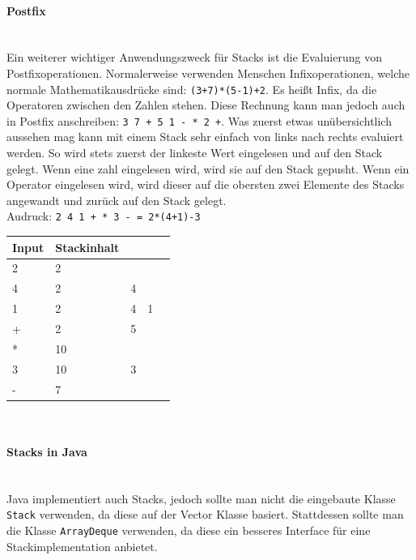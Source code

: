 \documentclass{article}
\newcommand{\paragraphlb}[1]{\paragraph{#1}\mbox{}\\}
\begin{document}
	\paragraphlb{Postfix}
	Ein weiterer wichtiger Anwendungszweck für Stacks ist die Evaluierung von Postfixoperationen. Normalerweise verwenden Menschen Infixoperationen, welche normale Mathematikausdrücke sind: \texttt{(3+7)*(5-1)+2}. Es heißt Infix, da die Operatoren zwischen den Zahlen stehen. Diese Rechnung kann man jedoch auch in Postfix anschreiben: \texttt{3 7 + 5 1 - * 2 +}. Was zuerst etwas unübersichtlich aussehen mag kann mit einem Stack sehr einfach von links nach rechts evaluiert werden. So wird stets zuerst der linkeste Wert eingelesen und auf den Stack gelegt. Wenn eine zahl eingelesen wird, wird sie auf den Stack gepusht. Wenn ein Operator eingelesen wird, wird dieser auf die obersten zwei Elemente des Stacks angewandt und zurück auf den Stack gelegt. \\
	Audruck: \texttt{2 4 1 + * 3 - = 2*(4+1)-3} \\
	\begin{tabular}{| l | l | l | l | l |}
		\toprule
		Input &Stackinhalt&&& \\ \midrule
		2 & 2 &&& \\ \hline
		4 & 2 & 4 && \\ \hline
		1 & 2 & 4 & 1 \\ \hline
		+ & 2 & 5 && \\ \hline
		* & 10 &&& \\ \hline
		3 & 10 & 3 && \\ \hline
		- & 7 &&& \\
		\bottomrule
	\end{tabular} \\
	\paragraphlb{Stacks in Java}
	Java implementiert auch Stacks, jedoch sollte man nicht die eingebaute Klasse \texttt{Stack} verwenden, da diese auf der Vector Klasse basiert. Stattdessen sollte man die Klasse \texttt{ArrayDeque} verwenden, da diese ein besseres Interface für eine Stackimplementation anbietet.
\end{document}
